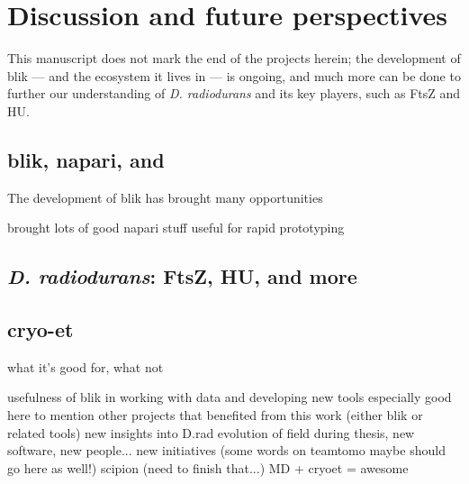 \chapter{Discussion and future perspectives}\label{future}

This manuscript does not mark the end of the projects herein; the development of blik --- and the ecosystem it lives in --- is ongoing, and much more can be done to further our understanding of \textit{D. radiodurans} and its key players, such as FtsZ and HU.

\localtableofcontents

\section{blik, napari, and }

The development of blik has brought many opportunities

brought lots of good napari stuff
useful for rapid prototyping


\section{\textit{D. radiodurans}: FtsZ, HU, and more}


\section{cryo-et}

what it's good for, what not




\localtableofcontents

\begin{outline}
\1 usefulness of blik in working with data and developing new tools
    \2 especially good here to mention other projects that benefited from this work (either blik or related tools)
\1 new insights into D.rad
\1 evolution of field during thesis, new software, new people... new initiatives (some words on teamtomo maybe should go here as well!)
\1 scipion (need to finish that...)
\1 MD + cryoet = awesome
\end{outline}
